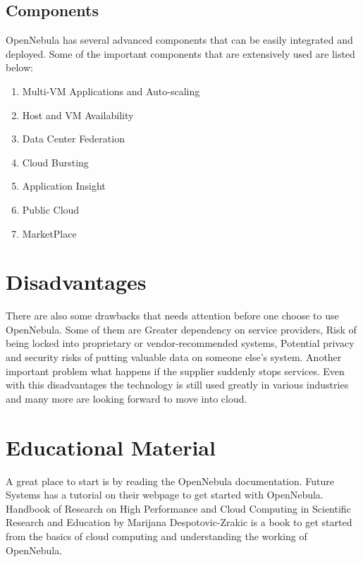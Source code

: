 \documentclass[9pt,twocolumn,twoside]{../../styles/osajnl}
\begin{document}
\subsection{Components}

OpenNebula has several {advanced components}\cite{www-components} 
that can be easily 
integrated and deployed. Some of the important components that are 
extensively used are listed below:

\begin{enumerate}
	
	\item Multi-VM Applications and Auto-scaling
	\item Host and VM Availability
	\item Data Center Federation
	\item Cloud Bursting
	\item Application Insight
	\item Public Cloud
	\item MarketPlace
	
\end{enumerate}

\section{Disadvantages}

There are also some drawbacks that needs attention before one choose to 
use OpenNebula. Some of them are Greater dependency on service providers, 
Risk of being locked into proprietary or vendor-recommended systems, 
Potential privacy and security risks of putting valuable data on someone else's system. 
Another important problem what happens if the supplier suddenly stops 
services. Even with this disadvantages the technology is still used 
greatly in various industries and many more are looking forward to 
move into cloud.

\section{Educational Material}

A great place to start is by reading the {OpenNebula 
documentation}\cite{www-opennebula-documentation}. 
{Future Systems has a tutorial on their 
webpage}\cite{www-opennebula-tutorial} to get started with 
OpenNebula. {Handbook of Research on High Performance and Cloud 
Computing in Scientific Research and Education}\cite{book-hpc} by 
Marijana Despotovic-Zrakic is a book to get started from the 
basics of cloud computing and understanding the working of OpenNebula.
\end{document}
